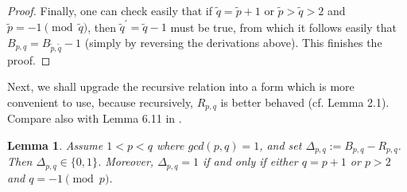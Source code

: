 \documentclass[11pt]{amsart}
\theoremstyle{plain}
\numberwithin{theorem}{section}
\newtheorem{lemma}[theorem]{Lemma}
\theoremstyle{definition}
\begin{document}
\begin{proof}
Finally, one can check easily that if $\tilde{q}=\tilde{p}+1$ or $\tilde{p}>\tilde{q}>2$ and $\tilde{p}=-1 \pmod{\tilde{q}}$, then $\tilde{q}^\prime=\tilde{q}-1$ must be true, from which it follows easily that 
$B_{p,q}=B_{\tilde{p},\tilde{q}}-1$ (simply by reversing the derivations above). This finishes the proof.

\end{proof}

Next, we shall upgrade the recursive relation into a form which is more convenient to use, because recursively, $R_{p,q}$ is better behaved (cf. Lemma 2.1). Compare also with Lemma 6.11 in \cite{C}.

\begin{lemma}
Assume $1<p<q$ where $gcd(p,q)=1$, and set $\Delta_{p,q}:=B_{p,q}-R_{p,q}$. 
Then $\Delta_{p,q}\in \{0,1\}$. Moreover, $\Delta_{p,q}=1$
if and only if either $q=p+1$ or $p>2$ and $q=-1\pmod{p}$. 
\end{lemma}
\end{document}
